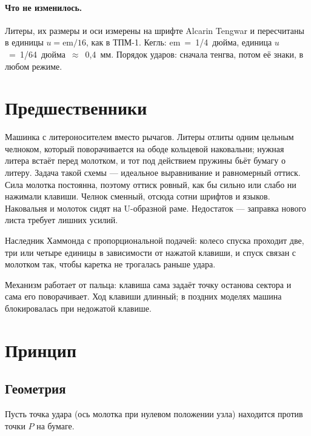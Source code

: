 \paragraph{Что не изменилось.} Литеры, их размеры и оси измерены на шрифте Alcarin Tengwar и пересчитаны в единицы $u = \mathrm{em}/16$, как в ТПМ-1. Кегль: em~=~1/4~дюйма, единица $u$~=~1/64~дюйма~$\approx$~0,4~мм. Порядок ударов: сначала тенгва, потом её знаки, в любом режиме.

\section{Предшественники}

\begin{description}[style=nextline,leftmargin=0pt]
  \item[Хаммонд (1880-е).] Машинка с литероносителем вместо рычагов. Литеры отлиты одним цельным челноком, который поворачивается на ободе кольцевой наковальни; нужная литера встаёт перед молотком, и тот под действием пружины бьёт бумагу о литеру. Задача такой схемы — идеальное выравнивание и равномерный оттиск. Сила молотка постоянна, поэтому оттиск ровный, как бы сильно или слабо ни нажимали клавиши. Челнок сменный, отсюда сотни шрифтов и языков. Наковальня и молоток сидят на U-образной раме. Недостаток — заправка нового листа требует лишних усилий.
  \item[Varityper.] Наследник Хаммонда с пропорциональной подачей: колесо спуска проходит две, три или четыре единицы в зависимости от нажатой клавиши, и спуск связан с молотком так, чтобы каретка не трогалась раньше удара.
  \item[Комптометр (1887).] Механизм работает от пальца: клавиша сама задаёт точку останова сектора и сама его поворачивает. Ход клавиши длинный; в поздних моделях машина блокировалась при недожатой клавише.
\end{description}

\section{Принцип}

\subsection{Геометрия}

Пусть точка удара (ось молотка при нулевом положении узла) находится против точки $P$ на бумаге.

